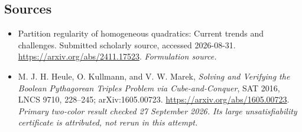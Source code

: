 \documentclass[11pt]{article}
\begin{document}
\subsection{Sources}
\begin{itemize}
\item[S1]Partition regularity of homogeneous quadratics: Current trends and challenges. Submitted scholarly source, accessed 2026-08-31.
\url{https://arxiv.org/abs/2411.17523}.
\textit{Formulation source.}
\item[E1] M. J. H. Heule, O. Kullmann, and V. W. Marek, \emph{Solving and Verifying the Boolean Pythagorean Triples Problem via Cube-and-Conquer}, SAT 2016, LNCS 9710, 228--245; arXiv:1605.00723.
\url{https://arxiv.org/abs/1605.00723}.
\textit{Primary two-color result checked 27 September 2026. Its large unsatisfiability certificate is attributed, not rerun in this attempt.}
\end{itemize}
\end{document}
